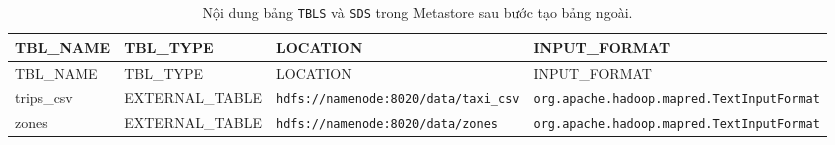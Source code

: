 \documentclass[
  12pt,
  a4paper,
]{article}
\begin{document}
\begin{longtable}[]{@{}
  >{\raggedright\arraybackslash}p{}
  >{\raggedright\arraybackslash}p{}
  >{\raggedright\arraybackslash}p{}
  >{\raggedright\arraybackslash}p{}@{}}
\caption{\label{tbl:l03-metastore}Nội dung bảng \texttt{TBLS} và
\texttt{SDS} trong Metastore sau bước tạo bảng ngoài.}\tabularnewline
\toprule\noalign{}
\begin{minipage}[b]{\linewidth}\raggedright
TBL\_NAME
\end{minipage} & \begin{minipage}[b]{\linewidth}\raggedright
TBL\_TYPE
\end{minipage} & \begin{minipage}[b]{\linewidth}\raggedright
LOCATION
\end{minipage} & \begin{minipage}[b]{\linewidth}\raggedright
INPUT\_FORMAT
\end{minipage} \\
\midrule\noalign{}
\endfirsthead
\toprule\noalign{}
\begin{minipage}[b]{\linewidth}\raggedright
TBL\_NAME
\end{minipage} & \begin{minipage}[b]{\linewidth}\raggedright
TBL\_TYPE
\end{minipage} & \begin{minipage}[b]{\linewidth}\raggedright
LOCATION
\end{minipage} & \begin{minipage}[b]{\linewidth}\raggedright
INPUT\_FORMAT
\end{minipage} \\
\midrule\noalign{}
\endhead
\bottomrule\noalign{}
\endlastfoot
trips\_csv & EXTERNAL\_TABLE &
\texttt{hdfs:}\allowbreak{}\texttt{/}\allowbreak{}\texttt{/}\allowbreak{}\texttt{namenode:}\allowbreak{}\texttt{8020/}\allowbreak{}\texttt{data/}\allowbreak{}\texttt{taxi\_}\allowbreak{}\texttt{csv}\allowbreak{}
&
\texttt{org.}\allowbreak{}\texttt{apache.}\allowbreak{}\texttt{hadoop.}\allowbreak{}\texttt{mapred.}\allowbreak{}\texttt{TextInputFormat}\allowbreak{} \\
zones & EXTERNAL\_TABLE &
\texttt{hdfs:}\allowbreak{}\texttt{/}\allowbreak{}\texttt{/}\allowbreak{}\texttt{namenode:}\allowbreak{}\texttt{8020/}\allowbreak{}\texttt{data/}\allowbreak{}\texttt{zones}\allowbreak{}
&
\texttt{org.}\allowbreak{}\texttt{apache.}\allowbreak{}\texttt{hadoop.}\allowbreak{}\texttt{mapred.}\allowbreak{}\texttt{TextInputFormat}\allowbreak{} \\
\end{longtable}
\end{document}
